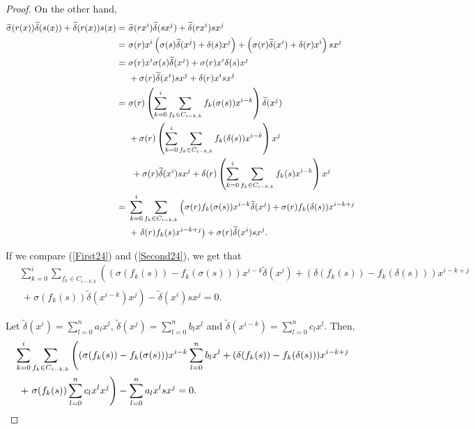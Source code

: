 \documentclass{amsart}
\theoremstyle{definition}
\theoremstyle{remark}
\numberwithin{equation}{section}
\begin{document}
\begin{proof}
On the other hand,
{\small{
\begin{align}
    \widetilde{\sigma}(r(x)) \widetilde{\delta}(s(x)) + \widetilde{\delta}(r(x))s(x) = &\ \widetilde{\sigma}(r x^i)\widetilde{\delta}(s x^j)+\widetilde{\delta}(r x^i) sx^j \notag \\
    = &\ \sigma(r) x^i\left(\sigma(s)\widetilde{\delta}(x^j) + \delta(s) x^j\right) + \left(\sigma(r)\widetilde{\delta}(x^i) + \delta(r) x^i\right)s x^j \notag \\
    = &\ \sigma(r) x^i \sigma(s)\widetilde{\delta}(x^j) + \sigma(r) x^i\delta(s) x^j \\
    &\ + \sigma(r)\widetilde{\delta}(x^i) sx^j + \delta(r) x^is x^j \notag \\
    = &\ \sigma(r)\left(\sum_{k=0}^{i}\sum_{f_k\in C_{i-k,k}}f_k(\sigma(s)) x^{i-k}\right)\widetilde{\delta}(x^j) \\
    &\ + \sigma(r)\left(\sum_{k=0}^{i}\sum_{f_k\in C_{i-k,k}}f_k(\delta(s)) x^{i-k}\right) x^j \notag \\ &\ \ + \sigma(r)\widetilde{\delta}(x^i) s x^j + \delta(r) \left(\sum_{k=0}^{i}\sum_{f_k\in C_{i-k,k}}f_k(s) x^{i-k}\right)x^j \notag \\
    = &\ \sum_{k=0}^{i}\sum_{f_k\in C_{i-k,k}}\left(\sigma(r)f_k(\sigma(s)) x^{i-k}\widetilde{\delta}(x^j) + \sigma(r)f_k(\delta(s)) x^{i-k+j} \right. \\
    &\ + \left. \delta(r)f_k(s) x^{i-k+j}\right) + \sigma(r)\widetilde{\delta}(x^i)s x^j. \label{Second24}
\end{align}
}}

If we compare (\ref{First24}) and (\ref{Second24}), we get that
\begin{align*}
&\ \sum_{k=0}^{i}\sum_{f_k\in C_{i-k,k}}\left((\sigma(f_k(s))-f_k(\sigma(s))) x^{i-k}\widetilde{\delta}(x^j) + (\delta(f_k(s))-f_k(\delta(s))) x^{i-k+j} \right. \\
&\ \ + \left. \sigma(f_k(s))\widetilde{\delta}(x^{i-k}) x^j\right) - \widetilde{\delta}(x^i)s x^j=0.
\end{align*}

Let $\widetilde{\delta}(x^i) = \sum\limits_{l=0}^{n} a_lx^l$, $\widetilde{\delta}(x^j) = \sum\limits_{l=0}^{n}b_l x^l$ and $\widetilde{\delta}(x^{i-k}) = \sum\limits_{l=0}^{n}c_l x^l$. Then,
\begin{align*}
&\ \notag \sum_{k=0}^{i}\sum_{f_k\in C_{i-k,k}}\left((\sigma(f_k(s))-f_k(\sigma(s))) x^{i-k}\sum_{l=0}^{n}b_l x^l+(\delta(f_k(s))-f_k(\delta(s))) x^{i-k+j} \right. \\ \notag
&\ \ \left. + \ \sigma(f_k(s))\sum_{l=0}^{n}c_l x^l x^j\right) - \sum_{l=0}^{n}a_l x^ls x^j=0. \notag
\end{align*}


\end{proof}
\end{document}
